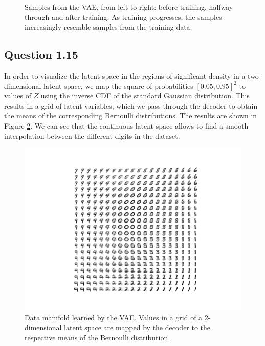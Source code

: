 \documentclass{article}
\begin{document}
\begin{figure}[t]
\begin{subfigure}{0.32\textwidth}
\end{subfigure}
 \caption{Samples from the VAE, from left to right: before training, halfway through and after training. As training progresses, the samples increasingly resemble samples from the training data.}
\label{fig:vae_samples}
\end{figure}

\subsection*{Question 1.15}

In order to visualize the latent space in the regions of significant density in a two-dimensional latent space, we map the square of probabilities $[0.05, 0.95]^2$ to values of $Z$ using the inverse CDF of the standard Gaussian distribution. This results in a grid of latent variables, which we pass through the decoder to obtain the means of the corresponding Bernoulli distributions. The results are shown in Figure \ref{fig:manifold}. We can see that the continuous latent space allows to find a smooth interpolation between the different digits in the dataset.

\begin{figure}[t]
\centering
\includegraphics[scale=0.8]{img/manifold}
\caption{Data manifold learned by the VAE. Values in a grid of a 2-dimensional latent space are mapped by the decoder to the respective means of the Bernoulli distribution.}
\label{fig:manifold}
\end{figure}

































\end{document}
